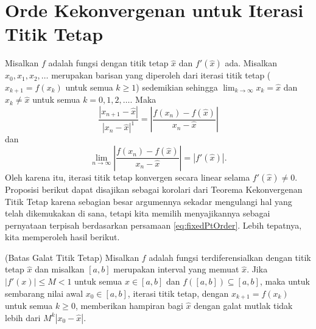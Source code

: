 
\section{\label{sec:fixedptOrder}Orde Kekonvergenan untuk Iterasi Titik Tetap
}

Misalkan $f$ adalah fungsi dengan titik tetap $\hat{x}$ dan $f'(\hat{x})$
ada. Misalkan $x_{0},x_{1},x_{2},\ldots$ merupakan barisan yang diperoleh
dari iterasi titik tetap ($x_{k+1}=f(x_{k})$ untuk semua $k\geq1$)
sedemikian sehingga ${\displaystyle \lim_{k\to\infty}x_{k}=\hat{x}}$
dan $x_{k}\neq\hat{x}$ untuk semua $k=0,1,2,\ldots$. Maka
\[
\frac{\left|x_{n+1}-\hat{x}\right|}{\left|x_{n}-\hat{x}\right|^{1}}=\left|\frac{f(x_{n})-f(\hat{x})}{x_{n}-\hat{x}}\right|
\]
dan
\begin{equation}
\lim_{n\to\infty}\left|\frac{f(x_{n})-f(\hat{x})}{x_{n}-\hat{x}}\right|=|f'(\hat{x})|.\label{eq:fixedPtOrder}
\end{equation}
Oleh karena itu, iterasi titik tetap konvergen secara linear selama
$f'(\hat{x})\neq0$. Proposisi berikut dapat disajikan sebagai korolari
dari Teorema Kekonvergenan Titik Tetap karena sebagian besar argumennya
sekadar mengulangi hal yang telah dikemukakan di sana, tetapi kita
memilih menyajikannya sebagai pernyataan terpisah berdasarkan persamaan
\ref{eq:fixedPtOrder}. Lebih tepatnya, kita memperoleh hasil berikut.
\begin{prop}
\label{prop:fixedPointErrorBound}(Batas Galat Titik Tetap) 
Misalkan $f$ adalah fungsi terdiferensialkan dengan titik tetap $\hat{x}$
dan misalkan $[a,b]$ merupakan interval yang memuat $\hat{x}$. Jika
$|f'(x)|\leq M<1$ untuk semua $x\in[a,b]$ dan $f([a,b])\subseteq[a,b]$,
maka untuk sembarang nilai awal $x_{0}\in[a,b]$, iterasi titik tetap,
dengan $x_{k+1}=f(x_{k})$ untuk semua $k\geq0$, memberikan hampiran
bagi $\hat{x}$ dengan galat mutlak tidak lebih dari $M^{k}|x_{0}-\hat{x}|$.
\end{prop}

